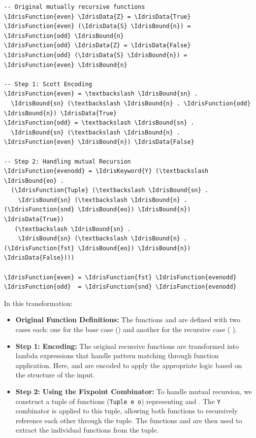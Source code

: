 \documentclass{IEEEtran}
\begin{document}
\begin{Verbatim}
-- Original mutually recursive functions
\IdrisFunction{even} \IdrisData{Z} = \IdrisData{True}
\IdrisFunction{even} (\IdrisData{S} \IdrisBound{n}) = \IdrisFunction{odd} \IdrisBound{n}
\IdrisFunction{odd} \IdrisData{Z} = \IdrisData{False}
\IdrisFunction{odd} (\IdrisData{S} \IdrisBound{n}) = \IdrisFunction{even} \IdrisBound{n}

-- Step 1: Scott Encoding
\IdrisFunction{even} = \textbackslash \IdrisBound{sn} .
  \IdrisBound{sn} (\textbackslash \IdrisBound{n} . \IdrisFunction{odd} \IdrisBound{n}) \IdrisData{True}
\IdrisFunction{odd} = \textbackslash \IdrisBound{sn} .
  \IdrisBound{sn} (\textbackslash \IdrisBound{n} . \IdrisFunction{even} \IdrisBound{n}) \IdrisData{False}

-- Step 2: Handling mutual Recursion
\IdrisFunction{evenodd} = \IdrisKeyword{Y} (\textbackslash \IdrisBound{eo} .
  (\IdrisFunction{Tuple} (\textbackslash \IdrisBound{sn} .
    \IdrisBound{sn} (\textbackslash \IdrisBound{n} . (\IdrisFunction{snd} \IdrisBound{eo}) \IdrisBound{n}) \IdrisData{True})
   (\textbackslash \IdrisBound{sn} .
    \IdrisBound{sn} (\textbackslash \IdrisBound{n} . (\IdrisFunction{fst} \IdrisBound{eo}) \IdrisBound{n}) \IdrisData{False})))

\IdrisFunction{even} = \IdrisFunction{fst} \IdrisFunction{evenodd}
\IdrisFunction{odd}  = \IdrisFunction{snd} \IdrisFunction{evenodd}
\end{Verbatim}


\par In this transformation:
\begin{itemize}
    \item \textbf{Original Function Definitions:} The functions  and  are defined with two cases each: one for the base case () and another for the recursive case ( ).
    \item \textbf{Step 1: Encoding:} The original recursive functions are transformed into lambda expressions that handle pattern matching through function application. Here,  and  are encoded to apply the appropriate logic based on the structure of the input.
    \item \textbf{Step 2: Using the Fixpoint Combinator:} To handle mutual recursion, we construct a tuple of functions (\texttt{Tuple e o}) representing  and . The \texttt{Y} combinator is applied to this tuple, allowing both functions to recursively reference each other through the tuple. The functions  and  are then used to extract the individual functions from the tuple.
\end{itemize}
\end{document}
